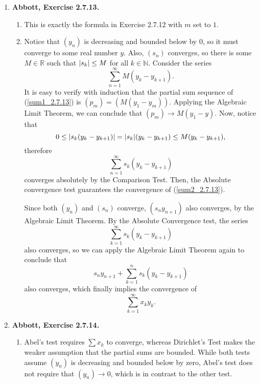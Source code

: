 \documentclass{article}
\DeclarePairedDelimiter\abs{\lvert}{\rvert}
\newcommand{\N}{\mathbb{N}}
\newcommand{\R}{\mathbb{R}}
\newcommand{\ra}{\rightarrow}
\newcommand{\exc}[2][Abbott]{\item \textbf{#1, Exercise #2.}}
\begin{document}
\begin{enumerate}
    \exc{2.7.13}
    \begin{enumerate}
        \item This is exactly the formula in Exercise 2.7.12 with $m$ set to $1$.
        
        \item Notice that $(y_n)$ is decreasing and bounded below by $0$, so it must converge to some real number $y$. Also, $(s_n)$ converges, so there is some $M \in \R$ such that $\abs{s_k} \leq M$ for all $k \in \N$. Consider the series
        \begin{equation}\label{sum1_2.7.13}
            \sum_{n=1}^\infty M (y_k - y_{k+1}).
        \end{equation} It is easy to verify with induction that the partial sum sequence of (\ref{sum1_2.7.13}) is $(p_m) = (M(y_1-y_m))$. Applying the Algebraic Limit Theorem, we can conclude that $(p_m) \ra M(y_1-y)$. Now, notice that 
        \begin{equation*}
            0 \leq \abs{s_k (y_k-y_{k+1})} = \abs{s_k} (y_k-y_{k+1}) \leq 
            M (y_k-y_{k+1}),
        \end{equation*} therefore 
        \begin{equation} \label{sum2_2.7.13}
            \sum_{n=1}^\infty s_k (y_k-y_{k+1})
        \end{equation} converges absolutely by the Comparison Test. Then, the Absolute convergence test guarantees the convergence of (\ref{sum2_2.7.13}).
        
        Since both $(y_n)$ and $(s_n)$ converge, $(s_n y_{n+1})$ also converges, by the Algebraic Limit Theorem. By the Absolute Convergence test, the series 
        \begin{equation*}
            \sum_{k=1}^\infty s_k(y_k-y_{k+1})
        \end{equation*} also converges, so we can apply the Algebraic Limit Theorem again to conclude that 
        \begin{equation*}
           s_n y_{n+1} + \sum_{k=1}^n s_k(y_k-y_{k+1})
        \end{equation*} also converges, which finally implies the convergence of 
        \begin{equation*}
            \sum_{k=1}^\infty x_k y_k. 
        \end{equation*}
    \end{enumerate}
    
    \exc{2.7.14}
    \begin{enumerate}
        \item Abel's test requires $\sum x_k$ to converge, whereas Dirichlet's Test makes the weaker assumption that the partial sums are bounded. While both tests assume $(y_n)$ is decreasing and bounded below by zero, Abel's test does not require that $(y_n) \ra 0$, which is in contrast to the other test.
        

\end{enumerate}
\end{enumerate}
\end{document}

